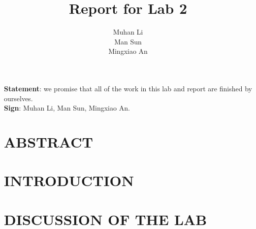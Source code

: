 \documentclass[12pt,letterpaper,onecolumn]{article}
\title{\titlefont Report for Lab 2\vspace{300pt}}
\author{\authorfont Muhan Li\\ \authorfont Man Sun\\ \authorfont Mingxiao An}
\date{}
\begin{document}
	\maketitle
	\thispagestyle{empty}
	\vspace{40pt}
	\hfill \newline
	\textbf{Statement}: we promise that all of the work in this lab and report are finished by ourselves.\\
	\textbf{Sign}: Muhan Li, Man Sun, Mingxiao An.\\
	\newpage
	\tableofcontents
	\newpage
	\section{ABSTRACT}	
		
	\section{INTRODUCTION}
		
	\section{DISCUSSION OF THE LAB}
		
\end{document}
